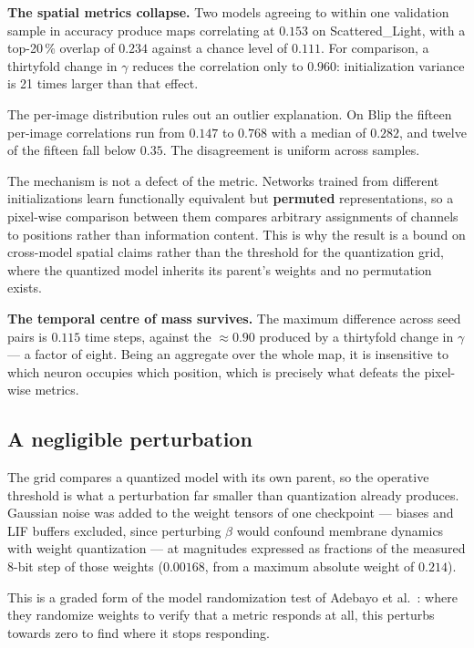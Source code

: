 \textbf{The spatial metrics collapse.} Two models agreeing to within one
validation sample in accuracy produce maps correlating at $0.153$ on
Scattered\_Light, with a top-20\,\% overlap of $0.234$ against a chance level of
$0.111$. For comparison, a thirtyfold change in $\gamma$ reduces the correlation
only to $0.960$: initialization variance is 21 times larger than that effect.

The per-image distribution rules out an outlier explanation. On Blip the fifteen
per-image correlations run from $0.147$ to $0.768$ with a median of $0.282$, and
twelve of the fifteen fall below $0.35$. The disagreement is uniform across
samples.

The mechanism is not a defect of the metric. Networks trained from different
initializations learn functionally equivalent but \textbf{permuted}
representations, so a pixel-wise comparison between them compares arbitrary
assignments of channels to positions rather than information content. This is why
the result is a bound on cross-model spatial claims rather than the threshold for
the quantization grid, where the quantized model inherits its parent's weights
and no permutation exists.

\textbf{The temporal centre of mass survives.} The maximum difference across seed
pairs is $0.115$ time steps, against the $\approx 0.90$ produced by a thirtyfold
change in $\gamma$ --- a factor of eight. Being an aggregate over the whole map,
it is insensitive to which neuron occupies which position, which is precisely
what defeats the pixel-wise metrics.

\subsection{A negligible perturbation}
\label{sec:perturbation}

The grid compares a quantized model with its own parent, so the operative
threshold is what a perturbation far smaller than quantization already produces.
Gaussian noise was added to the weight tensors of one checkpoint --- biases and
LIF buffers excluded, since perturbing $\beta$ would confound membrane dynamics
with weight quantization --- at magnitudes expressed as fractions of the measured
8-bit step of those weights ($0.00168$, from a maximum absolute weight of
$0.214$).

This is a graded form of the model randomization test of Adebayo et
al.~\cite{adebayo2018sanity}: where they randomize weights to verify that a
metric responds at all, this perturbs towards zero to find where it stops
responding.

